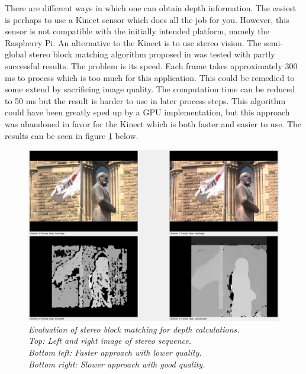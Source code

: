 
There are different ways in which one can obtain depth information. The easiest is perhaps to use a Kinect sensor which does all the job for you. However, this sensor is not compatible with the initially intended platform, namely the Raspberry Pi. An alternative to the Kinect is to use stereo vision. The semi-global stereo block matching algorithm proposed in \cite{StereoBM} was tested with partly successful results. The problem is its speed. Each frame takes approximately 300 ms to process which is too much for this application. This could be remedied to some extend by sacrificing image quality. The computation time can be reduced to 50 ms but the result is harder to use in later process steps. This algorithm could have been greatly sped up by a GPU implementation, but this approach was abandoned in favor for the Kinect which is both faster and easier to use. The results can be seen in figure \ref{fig:Stereo} below.

\vspace{1cm}
\begin{figure}[htb]
	\includegraphics[width=\linewidth]{images/stereoComp.png}
	\caption[An example of depth images calculated from a stereo sequence]{\textit{Evaluation of stereo block matching for depth calculations.\\ 
	Top: Left and right image of stereo sequence.\\ 
	Bottom left: Faster approach with lower quality.\\ 
	Bottom right: Slower approach with good quality.}}
	\label{fig:Stereo}  %
\end{figure}
\newpage

